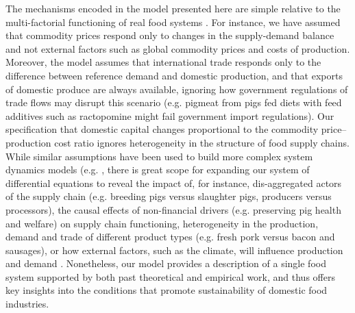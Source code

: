 \documentclass[9pt,twocolumn,twoside,lineno]{pnas-new}
\begin{document}
The mechanisms encoded in the model presented here are simple relative to the multi-factorial functioning of real food systems \cite{ericksen2008,ingram2011}. For instance, we have assumed that commodity prices respond only to changes in the supply-demand balance and not external factors such as global commodity prices and costs of production. Moreover, the model assumes that international trade responds only to the difference between reference demand and domestic production, and that exports of domestic produce are always available, ignoring how government regulations of trade flows may disrupt this scenario (e.g. pigmeat from pigs fed diets with feed additives such as ractopomine might fail government import regulations). Our specification that domestic capital changes proportional to the commodity price--production cost ratio \cite{sterman2000} ignores heterogeneity in the structure of food supply chains. While similar assumptions have been used to build more complex system dynamics models (e.g. \cite{meadows1971,sterman2000}, there is great scope for expanding our system of differential equations to reveal the impact of, for instance, dis-aggregated actors of the supply chain (e.g. breeding pigs versus slaughter pigs, producers versus processors), the causal effects of non-financial drivers (e.g. preserving pig health and welfare) on supply chain functioning, heterogeneity in the production, demand and trade of different product types (e.g. fresh pork versus bacon and sausages), or how external factors, such as the climate, will influence production and demand \cite{vermeulen2012}. Nonetheless, our model provides a description of a single food system supported by both past theoretical and empirical work, and thus offers key insights into the conditions that promote sustainability of domestic food industries.
\end{document}
